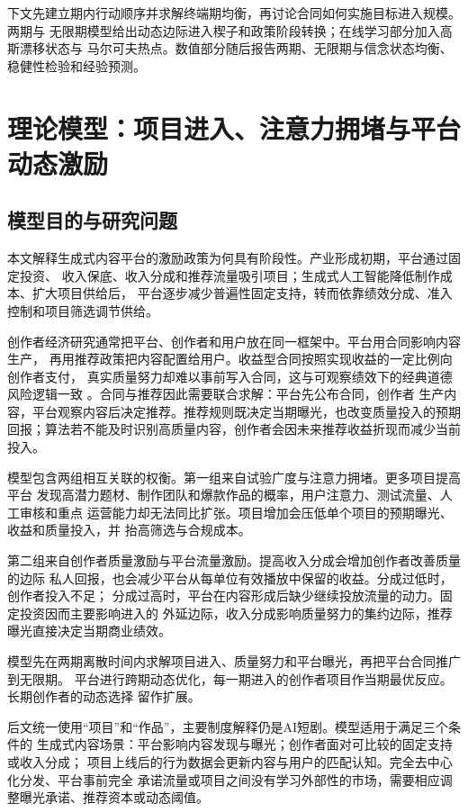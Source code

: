\documentclass[UTF8, a4paper, 12pt, fontset=fandol]{ctexart}
\theoremstyle{definition}
\theoremstyle{remark}
\begin{document}
下文先建立期内行动顺序并求解终端期均衡，再讨论合同如何实施目标进入规模。两期与
无限期模型给出动态边际进入楔子和政策阶段转换；在线学习部分加入高斯漂移状态与
马尔可夫热点。数值部分随后报告两期、无限期与信念状态均衡、稳健性检验和经验预测。

\section{理论模型：项目进入、注意力拥堵与平台动态激励}
\label{sec:theory}
\subsection{模型目的与研究问题}
本文解释生成式内容平台的激励政策为何具有阶段性。产业形成初期，平台通过固定投资、
收入保底、收入分成和推荐流量吸引项目；生成式人工智能降低制作成本、扩大项目供给后，
平台逐步减少普遍性固定支持，转而依靠绩效分成、准入控制和项目筛选调节供给。

创作者经济研究通常把平台、创作者和用户放在同一框架中。平台用合同影响内容生产，
再用推荐政策把内容配置给用户。收益型合同按照实现收益的一定比例向创作者支付，
真实质量努力却难以事前写入合同，这与可观察绩效下的经典道德风险逻辑一致
\citep{holmstrom1979moral}。合同与推荐因此需要联合求解：平台先公布合同，创作者
生产内容，平台观察内容后决定推荐。推荐规则既决定当期曝光，也改变质量投入的预期
回报；算法若不能及时识别高质量内容，创作者会因未来推荐收益折现而减少当前投入。

模型包含两组相互关联的权衡。第一组来自试验广度与注意力拥堵。更多项目提高平台
发现高潜力题材、制作团队和爆款作品的概率，用户注意力、测试流量、人工审核和重点
运营能力却无法同比扩张。项目增加会压低单个项目的预期曝光、收益和质量投入，并
抬高筛选与合规成本。

第二组来自创作者质量激励与平台流量激励。提高收入分成会增加创作者改善质量的边际
私人回报，也会减少平台从每单位有效播放中保留的收益。分成过低时，创作者投入不足；
分成过高时，平台在内容形成后缺少继续投放流量的动力。固定投资因而主要影响进入的
外延边际，收入分成影响质量努力的集约边际，推荐曝光直接决定当期商业绩效。

模型先在两期离散时间内求解项目进入、质量努力和平台曝光，再把平台合同推广到无限期。
平台进行跨期动态优化，每一期进入的创作者项目作当期最优反应。长期创作者的动态选择
留作扩展。

后文统一使用“项目”和“作品”，主要制度解释仍是AI短剧。模型适用于满足三个条件的
生成式内容场景：平台影响内容发现与曝光；创作者面对可比较的固定支持或收入分成；
项目上线后的行为数据会更新内容与用户的匹配认知。完全去中心化分发、平台事前完全
承诺流量或项目之间没有学习外部性的市场，需要相应调整曝光承诺、推荐资本或动态阈值。
\end{document}
